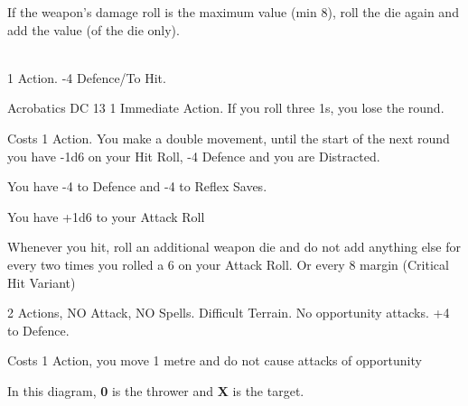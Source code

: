 \documentclass[landscape,10pt,a4paper]{article}
\begin{document}
\begin{multicols}{3}
\begin{dmbox}[title=Damage Explosion - page \pageref{damageexplosion}]
If the weapon's damage roll is the maximum value (min 8), roll the die again and add the value (of the die only).
\end{dmbox}

\begin{dmbox}[title=Standing Up From Prone - page \pageref{alzarsidaprono}]
\textbf{}\\
1 Action. -4 Defence/To Hit.

Acrobatics DC 13 1 Immediate Action. If you roll three 1s, you lose the round.
\end{dmbox}



\begin{dmbox}[title=Dash Action - page \pageref{azionediscatto}]
Costs 1 Action. You make a double movement, until the start of the next round you have -1d6 on your Hit Roll, -4 Defence and you are Distracted.
\end{dmbox}

\begin{dmbox}[title=Defence Against Surprise - page \pageref{defenceandattack}]
You have -4 to Defence and -4 to Reflex Saves.
\end{dmbox}

\begin{dmbox}[title=Touch Attack - page \pageref{difesaatocco}]
You have +1d6 to your Attack Roll
\end{dmbox}

\begin{dmbox}[title=Critical Hit - page \pageref{criticalhit}]
Whenever you hit, roll an additional weapon die and do not add anything else for every two times you rolled a 6 on your Attack Roll. Or every 8 margin (Critical Hit Variant)
\end{dmbox}

\begin{dmbox}[title=Total Defence - page \pageref{totaldifence}]
2 Actions, NO Attack, NO Spells. Difficult Terrain. No opportunity attacks. +4 to Defence.
\end{dmbox}

\begin{dmbox}[title=Disengage - page \pageref{disingaggiare}]
Costs 1 Action, you move 1 metre and do not cause attacks of opportunity
\end{dmbox}

\begin{dmbox}[title=Scatter Ranged Weapons - page \pageref{attackswithscatterweapons}]
In this diagram, \textbf{0} is the thrower and \textbf{X} is the target.\\


\end{dmbox}
\end{multicols}
\end{document}
